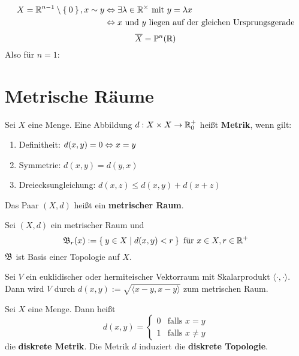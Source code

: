 \begin{beispiel}
    \begin{align*}
        X= \mathbb{R}^{n-1} \setminus \Set{0}, x \sim y &\Leftrightarrow \exists \lambda \in \mathbb{R}^\times \text{ mit } y = \lambda x\\
            &\Leftrightarrow x \text{ und } y \text{ liegen auf der gleichen Ursprungsgerade}
    \end{align*}
    \[\overline{X} = \mathbb{P}^n(\mathbb{R})\]
    Also für $n=1$:\nopagebreak\\
    
\end{beispiel}

\section{Metrische Räume}
\begin{definition}  
    Sei $X$ eine Menge. Eine Abbildung $d:X\times X \rightarrow \mathbb{R}_0^+$
    heißt \textbf{Metrik}, wenn gilt:

    \begin{enumerate}[label=(\roman*)]
        \item Definitheit:         \tabto{4cm} $d(x,y) = 0 \Leftrightarrow x = y$
        \item Symmetrie:           \tabto{4cm} $d(x,y) = d(y,x)$
        \item Dreiecksungleichung: \tabto{4cm} $d(x,z) \leq d(x,y) + d(x+z)$
    \end{enumerate}

    Das Paar $(X, d)$ heißt ein \textbf{metrischer Raum}.
\end{definition}

\begin{bemerkung}
    Sei $(X, d)$ ein metrischer Raum und
    \[\mathfrak{B}_r(x) := \Set{y \in X | d(x,y) < r} \text{ für } x \in X, r \in \mathbb{R}^+\]
    $\mathfrak{B}$ ist Basis einer Topologie auf $X$.
\end{bemerkung}

\begin{beispiel}
    Sei $V$ ein euklidischer oder hermiteischer Vektorraum mit Skalarprodukt
    $\langle \cdot , \cdot \rangle$.
    Dann wird $V$ durch $d(x,y) := \sqrt{\langle x-y, x-y \rangle}$ zum metrischen Raum.
\end{beispiel}

\begin{beispiel}  
    Sei $X$ eine Menge. Dann heißt
    \[d(x,y) = \begin{cases}
    0 & \text{falls } x=y\\
    1 & \text{falls } x \neq y
    \end{cases}\]
    die \textbf{diskrete Metrik}. Die Metrik $d$ induziert die 
    \textbf{diskrete Topologie}.
\end{beispiel}


